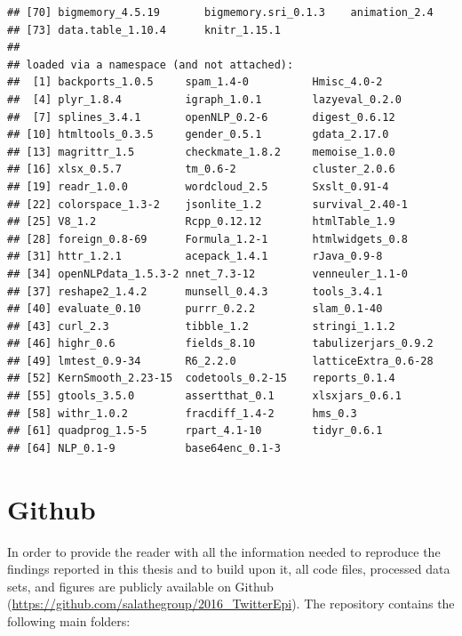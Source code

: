 \documentclass[11pt, a4paper,twoside]{report}\usepackage[]{graphicx}\usepackage[]{color}
\makeatletter
\newenvironment{kframe}{%
 \def\at@end@of@kframe{}%
 \ifinner\ifhmode%
  \def\at@end@of@kframe{\end{minipage}}%
  \begin{minipage}{\columnwidth}%
 \fi\fi%
 \def\FrameCommand##1{\hskip\@totalleftmargin \hskip-\fboxsep
 \colorbox{shadecolor}{##1}\hskip-\fboxsep
     \hskip-\linewidth \hskip-\@totalleftmargin \hskip\columnwidth}%
 \MakeFramed {\advance\hsize-\width
   \@totalleftmargin\z@ \linewidth\hsize
   \@setminipage}}%
 {\par\unskip\endMakeFramed%
 \at@end@of@kframe}
\newenvironment{knitrout}{}{} %
\newcommand{\prog}[1]{\textsf{#1}}
\makeatother
\begin{document}
\begin{knitrout}
\begin{kframe}
\begin{verbatim}
## [70] bigmemory_4.5.19       bigmemory.sri_0.1.3    animation_2.4         
## [73] data.table_1.10.4      knitr_1.15.1          
## 
## loaded via a namespace (and not attached):
##  [1] backports_1.0.5     spam_1.4-0          Hmisc_4.0-2        
##  [4] plyr_1.8.4          igraph_1.0.1        lazyeval_0.2.0     
##  [7] splines_3.4.1       openNLP_0.2-6       digest_0.6.12      
## [10] htmltools_0.3.5     gender_0.5.1        gdata_2.17.0       
## [13] magrittr_1.5        checkmate_1.8.2     memoise_1.0.0      
## [16] xlsx_0.5.7          tm_0.6-2            cluster_2.0.6      
## [19] readr_1.0.0         wordcloud_2.5       Sxslt_0.91-4       
## [22] colorspace_1.3-2    jsonlite_1.2        survival_2.40-1    
## [25] V8_1.2              Rcpp_0.12.12        htmlTable_1.9      
## [28] foreign_0.8-69      Formula_1.2-1       htmlwidgets_0.8    
## [31] httr_1.2.1          acepack_1.4.1       rJava_0.9-8        
## [34] openNLPdata_1.5.3-2 nnet_7.3-12         venneuler_1.1-0    
## [37] reshape2_1.4.2      munsell_0.4.3       tools_3.4.1        
## [40] evaluate_0.10       purrr_0.2.2         slam_0.1-40        
## [43] curl_2.3            tibble_1.2          stringi_1.1.2      
## [46] highr_0.6           fields_8.10         tabulizerjars_0.9.2
## [49] lmtest_0.9-34       R6_2.2.0            latticeExtra_0.6-28
## [52] KernSmooth_2.23-15  codetools_0.2-15    reports_0.1.4      
## [55] gtools_3.5.0        assertthat_0.1      xlsxjars_0.6.1     
## [58] withr_1.0.2         fracdiff_1.4-2      hms_0.3            
## [61] quadprog_1.5-5      rpart_4.1-10        tidyr_0.6.1        
## [64] NLP_0.1-9           base64enc_0.1-3
\end{verbatim}
\end{kframe}
\end{knitrout}

% 
% 
% 
% 
\cleardoublepage

\section*{Github} 
\thispagestyle{plain}
\label{app:github}

In order to provide the reader with all the information needed to reproduce the findings reported in this thesis and to build upon it, all code files, processed data sets, and figures are publicly available on Github (\url{https://github.com/salathegroup/2016_TwitterEpi}). The repository contains the following main folders: 
\end{document}
